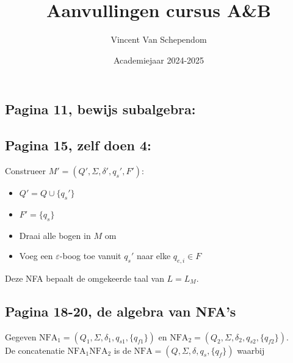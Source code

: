 \documentclass[kulak]{kulakarticle}
\title{Aanvullingen cursus A\&B}
\author{Vincent Van Schependom}
\date{Academiejaar 2024-2025}
\newcommand{\NFA}{\text{NFA}}
\theoremstyle{definition}
\begin{document}
	\maketitle

	\subsection*{Pagina 11, bewijs subalgebra:}

	

	\subsection*{Pagina 15, zelf doen 4:}

	Construeer \(M'=(Q',\Sigma,\delta',q_s',F')\):
	\begin{itemize}
		\item \( Q'=Q\cup\{q_s'\} \)
		\item \( F'=\{q_s\} \)
		\item Draai alle bogen in \(M\) om
		\item Voeg een \( \varepsilon \)-boog toe vanuit \( q_s' \) naar elke \(q_{e,i} \in F\)
	\end{itemize}

	Deze NFA bepaalt de omgekeerde taal van \(L=L_M\).

	\subsection*{Pagina 18-20, de algebra van NFA's}

	Gegeven \(\NFA_1 = (Q_1,\Sigma,\delta_1,q_{s1},\{q_{f1}\})\) en \(\NFA_2 = (Q_2,\Sigma,\delta_2,q_{s2},\{q_{f2}\})\). \\

	De concatenatie \(\NFA_1\NFA_2\) is de \(\NFA = (Q,\Sigma,\delta,q_s,\{q_f\})\) waarbij
\end{document}
